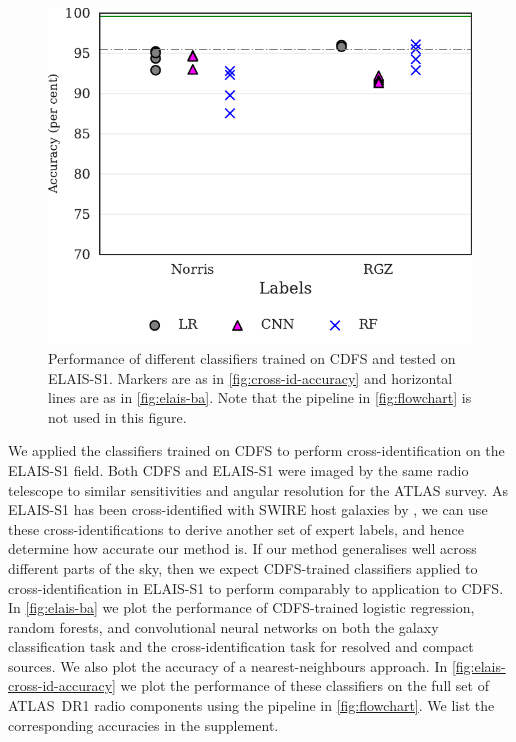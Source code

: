 \documentclass[fleqn,usenatbib,usedcolumn]{mnras}
\begin{document}
  \begin{figure}
    \centering
    \includegraphics[width=0.9\columnwidth]{images/elais_cross_identification_grid.pdf}
    \caption{Performance of different classifiers trained on CDFS and tested on ELAIS-S1. Markers are as in \autoref{fig:cross-id-accuracy} and horizontal lines are as in \autoref{fig:elais-ba}. Note that the pipeline in \autoref{fig:flowchart} is not used in this figure.
      \label{fig:elais-cross-id-accuracy}}
  \end{figure}

  We applied the classifiers trained on CDFS to perform cross-identification on the ELAIS-S1 field. Both CDFS and ELAIS-S1 were imaged by the same radio telescope to similar sensitivities and angular resolution for the ATLAS survey. As ELAIS-S1 has been cross-identified with SWIRE host galaxies by \citet{middelberg08}, we can use these cross-identifications to derive another set of expert labels, and hence determine how accurate our method is. If our method generalises well across different parts of the sky, then we expect CDFS-trained classifiers applied to cross-identification in ELAIS-S1 to perform comparably to application to CDFS. In \autoref{fig:elais-ba} we plot the performance of CDFS-trained logistic regression, random forests, and convolutional neural networks on both the galaxy classification task and the cross-identification task for resolved and compact sources. We also plot the accuracy of a nearest-neighbours approach. In \autoref{fig:elais-cross-id-accuracy} we plot the performance of these classifiers on the full set of ATLAS~DR1 radio components using the pipeline in \autoref{fig:flowchart}. We list the corresponding accuracies in the supplement.
\end{document}

